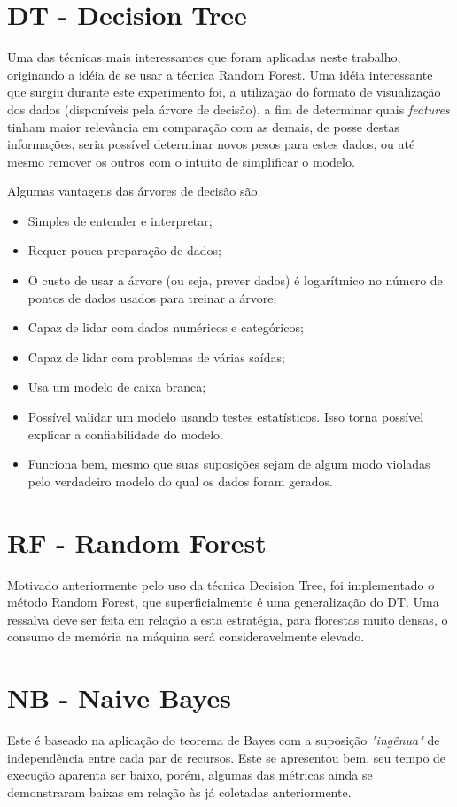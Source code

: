 \documentclass[
	12pt,				    %
	openright,			    %
	oneside,			    %
	a4paper,			    %
    sumario=tradicional,    %
	english,			    %
	brazil,				    %
	]{abntex2}
\begin{document}
\section{DT - Decision Tree}\label{sec:DT}
Uma das técnicas mais interessantes que foram aplicadas neste trabalho, originando a idéia de se usar a técnica Random Forest. Uma idéia interessante que surgiu durante este experimento foi, a utilização do formato de visualização dos dados (disponíveis pela árvore de decisão), a fim de determinar quais \textit{features} tinham maior relevância em comparação com as demais, de posse destas informações, seria possível determinar novos pesos para estes dados, ou até mesmo remover os outros com o intuito de simplificar o modelo.

Algumas vantagens das árvores de decisão são:
\begin{itemize}
\item Simples de entender e interpretar;
\item Requer pouca preparação de dados;
\item O custo de usar a árvore (ou seja, prever dados) é logarítmico no número de pontos de dados usados para treinar a árvore;
\item Capaz de lidar com dados numéricos e categóricos;
\item Capaz de lidar com problemas de várias saídas;
\item Usa um modelo de caixa branca;
\item Possível validar um modelo usando testes estatísticos. Isso torna possível explicar a confiabilidade do modelo.
\item Funciona bem, mesmo que suas suposições sejam de algum modo violadas pelo verdadeiro modelo do qual os dados foram gerados.
\end{itemize}

\section{RF - Random Forest}\label{sec:RF}
Motivado anteriormente pelo uso da técnica Decision Tree, foi implementado o método Random Forest, que superficialmente é uma generalização do DT. Uma ressalva deve ser feita em relação a esta estratégia, para florestas muito densas, o consumo de memória na máquina será consideravelmente elevado.

\section{NB - Naive Bayes}\label{sec:NB}
Este é baseado na aplicação do teorema de Bayes com a suposição \textit{"ingênua"} de independência entre cada par de recursos. Este se apresentou bem, seu tempo de execução aparenta ser baixo, porém, algumas das métricas ainda se demonstraram baixas em relação às já coletadas anteriormente.
\end{document}
